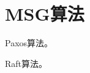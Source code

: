 \chapter{MSG算法}

\begin{theorem}
    
    Paxos算法。
    
\end{theorem}

\begin{theorem}

    Raft算法。

\end{theorem}

